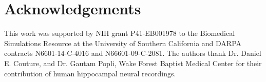 \documentclass[11pt,a4paper,final]{article}
\begin{document}
\section*{Acknowledgements}
This work was supported by NIH grant P41-EB001978 to the Biomedical Simulations Resource at the University of Southern California and DARPA contracts N6601-14-C-4016 and N66601-09-C-2081.  The authors thank Dr. Daniel E. Couture, and Dr. Gautam Popli, Wake Forest Baptist Medical Center for their contribution of human hippocampal neural recordings.

%

\printbibliography[heading=bibintoc]
\end{document}
